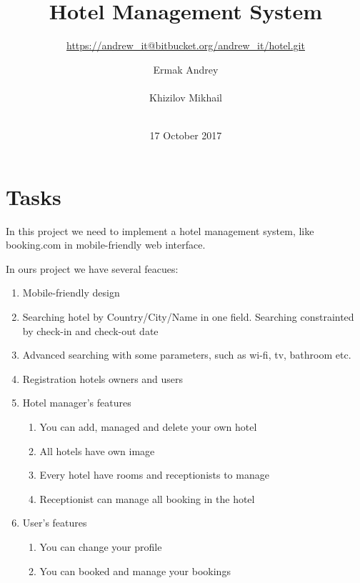 \documentclass{sig-alternate-05-2015}
\begin{document}
\title{Hotel Management System}
\subtitle{\href{https://andrew_it@bitbucket.org/andrew_it/hotel.git}{https://andrew\_it@bitbucket.org/andrew\_it/hotel.git}}


\author{
\alignauthor
Ermak Andrey\\
       \\
\alignauthor
Khizilov Mikhail\\
	   \\
}

\date{17 October 2017}

\maketitle

\section{Tasks}
In this project we need to implement a hotel management system, like booking.com in mobile-friendly web interface. 

In ours project we have several feacues:

\begin{enumerate}
\item Mobile-friendly design
\item Searching hotel by Country/City/Name in one field. Searching constrainted by check-in and check-out date
\item Advanced searching with some parameters, such as wi-fi, tv, bathroom etc. 
\item Registration hotels owners and users
\item Hotel manager's features
\begin{enumerate}
	\item You can add, managed and delete your own hotel
	\item All hotels have own image
	\item Every hotel have rooms and receptionists to manage
	\item Receptionist can manage all booking in the hotel
\end{enumerate}
\item User's features
\begin{enumerate}
	\item You can change your profile
	\item You can booked and manage your bookings
\end{enumerate}
\end{enumerate}
\end{document}
